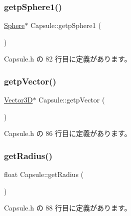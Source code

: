 \subsubsection{\texorpdfstring{getp\+Sphere1()}{getpSphere1()}}
{\footnotesize\ttfamily \mbox{\hyperlink{class_sphere}{Sphere}}$\ast$ Capsule\+::getp\+Sphere1 (\begin{DoxyParamCaption}{ }\end{DoxyParamCaption})\hspace{0.3cm}{\ttfamily [inline]}}



 Capsule.\+h の 82 行目に定義があります。

\mbox{\label{class_capsule_a1793de155de657088c546727b393367a}} 
\subsubsection{\texorpdfstring{getp\+Vector()}{getpVector()}}
{\footnotesize\ttfamily \mbox{\hyperlink{class_vector3_d}{Vector3D}}$\ast$ Capsule\+::getp\+Vector (\begin{DoxyParamCaption}{ }\end{DoxyParamCaption})\hspace{0.3cm}{\ttfamily [inline]}}



 Capsule.\+h の 86 行目に定義があります。

\mbox{\label{class_capsule_a4e98e8545ea57fe682c5a2002bd49bdb}} 
\subsubsection{\texorpdfstring{get\+Radius()}{getRadius()}}
{\footnotesize\ttfamily float Capsule\+::get\+Radius (\begin{DoxyParamCaption}{ }\end{DoxyParamCaption})\hspace{0.3cm}{\ttfamily [inline]}}



 Capsule.\+h の 88 行目に定義があります。

\mbox{\label{class_capsule_a89dc585afa88e50e84a2f98bbf0bb400}} 
